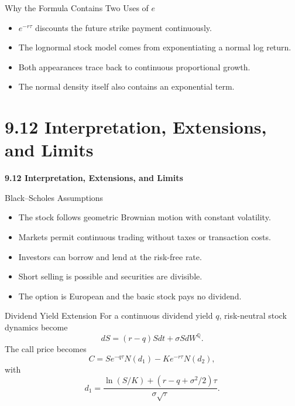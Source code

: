 \documentclass[aspectratio=169]{beamer}
\begin{document}
\begin{frame}[t]{Why the Formula Contains Two Uses of $e$}
\justifying
\begin{itemize}
\item $e^{-r\tau}$ discounts the future strike payment continuously.
\item The lognormal stock model comes from exponentiating a normal log return.
\item Both appearances trace back to continuous proportional growth.
\item The normal density itself also contains an exponential term.
\end{itemize}
\end{frame}

\section{9.12 Interpretation, Extensions, and Limits}
\begin{frame}[plain]
\centering\vfill
{\color{TitleBlue}\Large\bfseries 9.12 Interpretation, Extensions, and Limits}\par
\vspace{0.5cm}{\large What the model assumes and how practitioners adapt it}\par
\vfill\end{frame}

\begin{frame}[t]{Black--Scholes Assumptions}
\justifying
\begin{itemize}
\item The stock follows geometric Brownian motion with constant volatility.
\item Markets permit continuous trading without taxes or transaction costs.
\item Investors can borrow and lend at the risk-free rate.
\item Short selling is possible and securities are divisible.
\item The option is European and the basic stock pays no dividend.
\end{itemize}
\end{frame}

\begin{frame}[t]{Dividend Yield Extension}
\justifying
For a continuous dividend yield $q$, risk-neutral stock dynamics become
\[dS=(r-q)Sdt+\sigma SdW^{\mathbb Q}.\]
The call price becomes
\[C=S e^{-q\tau}N(d_1)-Ke^{-r\tau}N(d_2),\]
with
\[d_1=\frac{\ln(S/K)+(r-q+\sigma^2/2)\tau}{\sigma\sqrt\tau}.\]
\end{frame}
\end{document}
